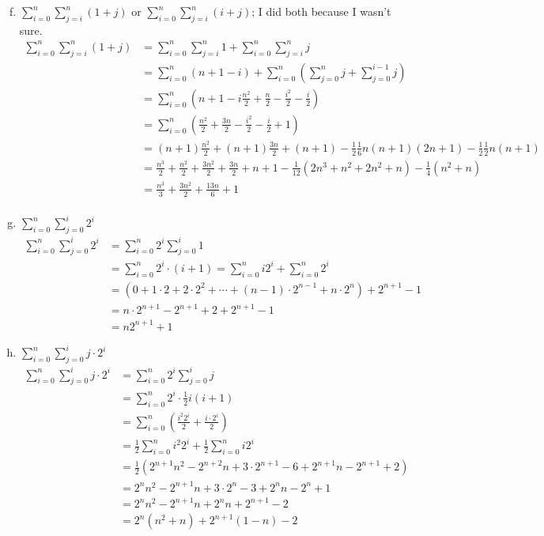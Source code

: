\documentclass{article}
\begin{document}
\begin{enumerate}[(a)]\setcounter{enumi}{5}
  \item $\sum_{i=0}^n \sum_{j=i}^n (1+j)$ or $\sum_{i=0}^n \sum_{j=i}^n (i+j)$; I did both because I wasn't sure. 
    \begin{align*}
      \sum_{i=0}^n \sum_{j=i}^n (1+j) &= \sum_{i=0}^n \sum_{j=i}^n 1 + \sum_{i=0}^n \sum_{j=i}^n j \\
      &= \sum_{i=0}^n (n + 1 - i) + \sum_{i=0}^n (\sum_{j=0}^n j + \sum_{j=0}^{i-1} j) \\
      &= \sum_{i=0}^n (n+1-i \frac{n^2}{2} + \frac{n}{2} - \frac{i^2}{2} - \frac{i}{2} )\\
      &= \sum_{i=0}^n (\frac{n^2}{2} + \frac{3n}{2}  - \frac{i^2}{2} -\frac{i}{2} + 1) \\
      &= (n+1)\frac{n^2}{2} + (n+1)\frac{3n}{2} + (n+1) - \frac{1}{2}\frac{1}{6}n(n+1)(2n+1) - \frac{1}{2}\frac{1}{2}n(n+1) \\
      &= \frac{n^3}{2} + \frac{n^2}{2} + \frac{3n^2}{2} + \frac{3n}{2} + n + 1 - \frac{1}{12}(2n^3 + n^2 + 2n^2 + n) - \frac{1}{4}(n^2 + n) \\
      &= \frac{n^3}{3} + \frac{3n^2}{2} + \frac{13n}{6} + 1 \\
    \end{align*}
  \item $\sum_{i=0}^n \sum_{j=0}^i 2^i$
    \begin{align*}
      \sum_{i=0}^n \sum_{j=0}^i 2^i &= \sum_{i=0}^n 2^i \sum_{j=0}^i 1 \\
      &= \sum_{i=0}^n 2^i \cdot (i + 1) = \sum_{i=0}^n i2^i + \sum_{i=0}^n 2^i \\
      &= (0 + 1\cdot 2 + 2\cdot2^2 + \cdots + (n-1)\cdot2^{n-1} + n\cdot2^n) + 2^{n+1} - 1 \\
      &= n\cdot2^{n+1} - 2^{n+1} + 2 + 2^{n+1} -1 \\
      &= n2^{n+1} +1 
    \end{align*}
  \item $\sum_{i=0}^n \sum_{j=0}^i j\cdot2^i$
    \begin{align*}
      \sum_{i=0}^n \sum_{j=0}^i j\cdot2^i &= \sum_{i=0}^n 2^i \sum_{j=0}^i j \\
      &= \sum_{i=0}^n 2^i \cdot \frac{1}{2}i(i+1) \\
      &= \sum_{i=0}^n ( \frac{i^2 2^i}{2} + \frac{i\cdot2^i}{2} )\\
      &= \frac{1}{2} \sum_{i=0}^n  i^2 2^i + \frac{1}{2} \sum_{i=0}^n i 2^i \\
      &= \frac{1}{2} (2^{n+1} n^2 - 2^{n+2} n + 3\cdot2^{n+1} - 6 + 2^{n+1}n - 2^{n+1} +2) \\
      &= 2^n n^2 - 2^{n+1}n + 3\cdot2^{n} - 3 + 2^n n - 2^n + 1 \\
      &= 2^n n^2 - 2^{n+1} n + 2^n n + 2^{n+1} - 2 \\
      &= 2^n (n^2 + n) + 2^{n+1} (1-n) -2 
    \end{align*}
\end{enumerate}
\end{document}

